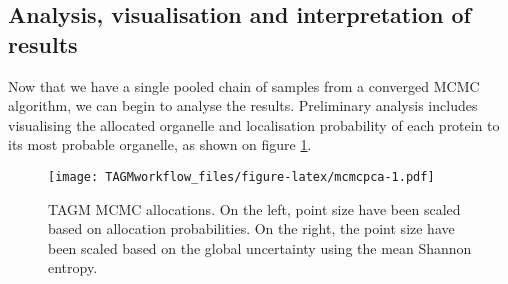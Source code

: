 \documentclass[]{article}
\newenvironment{Shaded}{\begin{snugshade}}{\end{snugshade}}
\newcommand{\KeywordTok}[1]{\textcolor[rgb]{0.13,0.29,0.53}{\textbf{{#1}}}}
\newcommand{\DataTypeTok}[1]{\textcolor[rgb]{0.13,0.29,0.53}{{#1}}}
\newcommand{\DecValTok}[1]{\textcolor[rgb]{0.00,0.00,0.81}{{#1}}}
\newcommand{\FloatTok}[1]{\textcolor[rgb]{0.00,0.00,0.81}{{#1}}}
\newcommand{\StringTok}[1]{\textcolor[rgb]{0.31,0.60,0.02}{{#1}}}
\newcommand{\NormalTok}[1]{{#1}}
\begin{document}
\subsection{Analysis, visualisation and interpretation of
results}\label{analysis-visualisation-and-interpretation-of-results}

Now that we have a single pooled chain of samples from a converged MCMC
algorithm, we can begin to analyse the results. Preliminary analysis
includes visualising the allocated organelle and localisation
probability of each protein to its most probable organelle, as shown on
figure \ref{fig:mcmcpca}.

\begin{Shaded}
\end{Shaded}

\begin{figure}[htbp]
\centering
\texttt{[image: TAGMworkflow\_files/figure-latex/mcmcpca-1.pdf]}
\caption{\label{fig:mcmcpca}TAGM MCMC allocations. On the left, point size
have been scaled based on allocation probabilities. On the right, the
point size have been scaled based on the global uncertainty using the
mean Shannon entropy.}
\end{figure}
\end{document}
